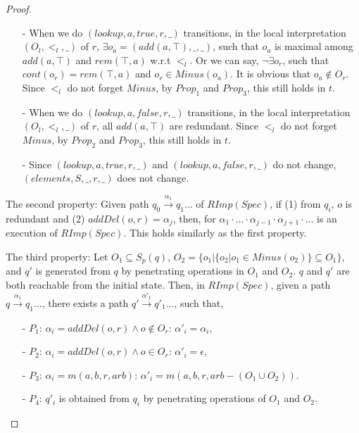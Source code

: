 \begin {proof}
\begin{itemize}
\item[-] When we do $(lookup,a,\textit{true},r,\_)$ transitions, in the local interpretation $(O_l,<_l,\_)$ of $r$, $\exists o_a=(add(a,\top),\_,\_)$, such that $o_a$ is maximal among $add(a,\top)$ and $rem(\top,a)$ w.r.t $<_l$. Or we can say, $\neg \exists o_r$, such that $cont(o_r)=rem(\top,a)$ and $o_r \in Minus(o_a)$. It is obvious that $o_a \notin O_r$. Since $<_l$ do not forget $Minus$, by $Prop_1$ and $Prop_3$, this still holds in $t$.

\item[-] When we do $(lookup,a,\textit{false},r,\_)$ transitions, in the local interpretation $(O_l,<_l,\_)$ of $r$, all $add(a,\top)$ are redundant. Since $<_l$ do not forget $Minus$, by $Prop_2$ and $Prop_3$, this still holds in $t$. 

\item[-] Since $(lookup,a,\textit{true},r,\_)$ and $(lookup,a,\textit{false},r,\_)$ do not change, $(elements,S,\_,r,\_)$ does not change.
\end{itemize} 

The second property: Given path $q_0 {\xrightarrow{\alpha_1}} q_1 \ldots$ of $RImp(Spec)$, if (1) from $q_i$, $o$ is redundant and (2) $addDel(o,r)=\alpha_j$, then, for $\alpha_1 \cdot \ldots \cdot \alpha_{j-1} \cdot \alpha_{j+1} \cdot \ldots$ is an execution of $RImp(Spec)$. This holds similarly as the first property.

The third property: Let $O_1 \subseteq S_p(q)$, $O_2 = \{ o_1 \vert  \{ o_2 \vert o_1 \in Minus(o_2) \} \subseteq O_1 \}$, and $q'$ is generated from $q$ by penetrating operations in $O_1$ and $O_2$. $q$ and $q'$ are both reachable from the initial state. Then, in $RImp(Spec)$, given a path $q {\xrightarrow{\alpha_1}} q_1 \ldots$, there exists a path $q' {\xrightarrow{\alpha'_1}} q'_1 \ldots$, such that,

\begin{itemize}
\setlength{\itemsep}{0.5pt}
\item[-] $P_1$: $\alpha_i = addDel(o,r) \wedge o \notin O_r$: $\alpha'_i = \alpha_i$,

\item[-] $P_2$: $\alpha_i = addDel(o,r) \wedge o \in O_r$: $\alpha'_i = \epsilon$,

\item[-] $P_3$: $\alpha_i = m(a,b,r,arb)$: $\alpha'_i = m(a,b,r,arb-(O_1 \cup O_2))$.

\item[-] $P_4$: $q'_i$ is obtained from $q_i$ by penetrating operations of $O_1$ and $O_2$.
\end{itemize} 


\end{proof}
